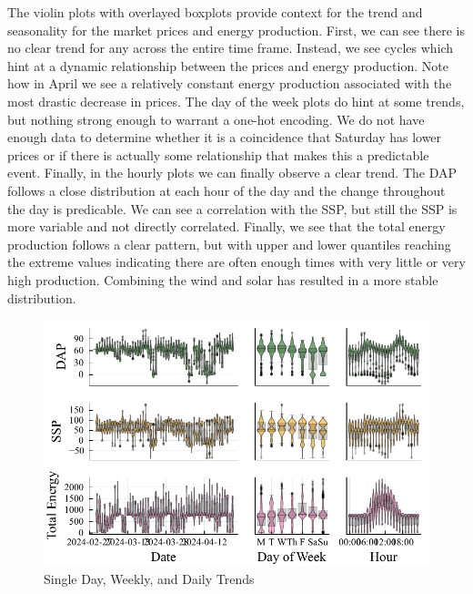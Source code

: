 \documentclass[
  journal,
]{IEEEtran}%
\begin{document}
The violin plots with overlayed boxplots provide context for the trend
and seasonality for the market prices and energy production. First, we
can see there is no clear trend for any across the entire time frame.
Instead, we see cycles which hint at a dynamic relationship between the
prices and energy production. Note how in April we see a relatively
constant energy production associated with the most drastic decrease in
prices. The day of the week plots do hint at some trends, but nothing
strong enough to warrant a one-hot encoding. We do not have enough data
to determine whether it is a coincidence that Saturday has lower prices
or if there is actually some relationship that makes this a predictable
event. Finally, in the hourly plots we can finally observe a clear
trend. The DAP follows a close distribution at each hour of the day and
the change throughout the day is predicable. We can see a correlation
with the SSP, but still the SSP is more variable and not directly
correlated. Finally, we see that the total energy production follows a
clear pattern, but with upper and lower quantiles reaching the extreme
values indicating there are often enough times with very little or very
high production. Combining the wind and solar has resulted in a more
stable distribution.

\begin{figure}

{\centering \includegraphics{EnergyProdConformalLSTM_files/mediabag/EnergyProdConformalLSTM_files/figure-pdf/violin-plots-output-1.pdf}

}

\caption{Single Day, Weekly, and Daily Trends}

\end{figure}%
\end{document}
